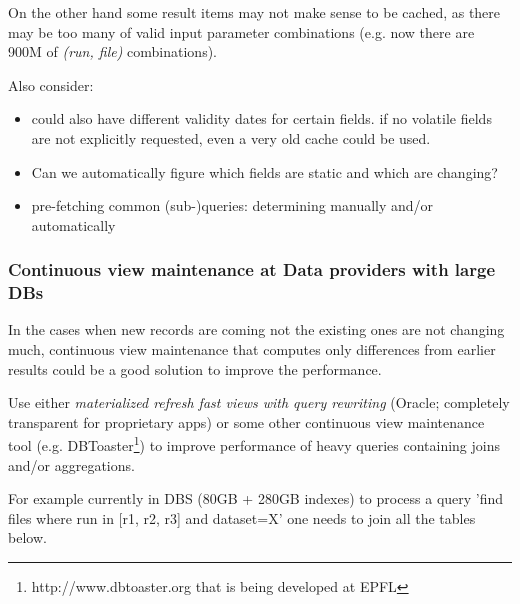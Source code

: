 On the other hand some result items may not make sense to be cached, as there may be too many of valid input parameter combinations (e.g. now there are 900M of \textit{(run, file)} combinations).

Also consider:
                			\begin{itemize}
                			\item could also have different validity dates for certain fields. if no volatile fields are not explicitly requested, even a very old cache could be used. 
                			\item Can we automatically figure which fields are static and which are changing?
                			\item pre-fetching common (sub-)queries: determining manually and/or automatically
                			\end{itemize}





\subsubsection*{Continuous view maintenance at Data providers with large DBs}
In the cases when new records are coming not the existing ones are not changing much, continuous view maintenance that computes only differences from earlier results could be a good solution to improve the performance. 


Use either \textit{materialized refresh fast views with query rewriting} (Oracle; completely transparent for proprietary apps)\cite{Oracle11}
 or some other continuous view maintenance tool (e.g. DBToaster\footnote{http://www.dbtoaster.org that is being developed at EPFL}) to improve performance of heavy queries containing joins and/or aggregations.

For example currently in DBS (80GB + 280GB indexes) to process a query 'find files where run in [r1, r2, r3] and dataset=X' one needs to join all the tables below.

